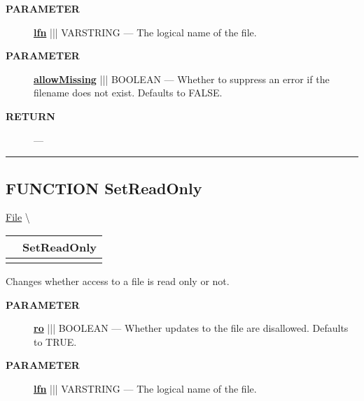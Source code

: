\par
\begin{description}
\item [\colorbox{tagtype}{\color{white} \textbf{\textsf{PARAMETER}}}] \textbf{\underline{lfn}} ||| VARSTRING --- The logical name of the file.
\item [\colorbox{tagtype}{\color{white} \textbf{\textsf{PARAMETER}}}] \textbf{\underline{allowMissing}} ||| BOOLEAN --- Whether to suppress an error if the filename does not exist. Defaults to FALSE.
\end{description}







\par
\begin{description}
\item [\colorbox{tagtype}{\color{white} \textbf{\textsf{RETURN}}}] \textbf{} --- 
\end{description}




\rule{\linewidth}{0.5pt}
\subsection*{\textsf{\colorbox{headtoc}{\color{white} FUNCTION}
SetReadOnly}}

\hypertarget{ecldoc:file.setreadonly}{}
\hspace{0pt} \hyperlink{ecldoc:File}{File} \textbackslash 

{\renewcommand{\arraystretch}{1.5}
\begin{tabularx}{\textwidth}{|>{\raggedright\arraybackslash}l|X|}
\hline
\hspace{0pt}\mytexttt{\color{red} } & \textbf{SetReadOnly} \\
\hline
\multicolumn{2}{|>{\raggedright\arraybackslash}X|}{\hspace{0pt}\mytexttt{\color{param} (varstring lfn, boolean ro=TRUE)}} \\
\hline
\end{tabularx}
}

\par





Changes whether access to a file is read only or not.






\par
\begin{description}
\item [\colorbox{tagtype}{\color{white} \textbf{\textsf{PARAMETER}}}] \textbf{\underline{ro}} ||| BOOLEAN --- Whether updates to the file are disallowed. Defaults to TRUE.
\item [\colorbox{tagtype}{\color{white} \textbf{\textsf{PARAMETER}}}] \textbf{\underline{lfn}} ||| VARSTRING --- The logical name of the file.
\end{description}







